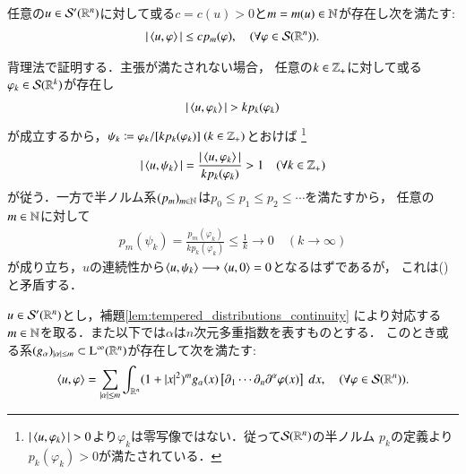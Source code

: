 	\begin{screen}
		\begin{lem}\label{lem:tempered_distributions_continuity}
			任意の$u \in \mathcal{S}'(\mathbb{R}^n)$に対して或る$c = c(u) > 0$と$m = m(u) \in \mathbb{N}$が存在し次を満たす:
			\begin{align}
				|\inprod<u,\varphi>| \leq c p_m(\varphi),
				\quad (\forall \varphi \in \rapid{\R^n}).
			\end{align}
		\end{lem}
	\end{screen}
	
	\begin{prf}
		背理法で証明する．主張が満たされない場合，
		任意の$k \in \mathbb{Z}_+$に対して或る$\varphi_k \in \mathcal{S}(\mathbb{R}^k)$が存在し
		\begin{align}
			|\inprod<u,\varphi_k>| > k p_k(\varphi_k)
		\end{align}
		が成立するから，$\psi_k \coloneqq \varphi_k / [k p_k(\varphi_k)]\ (k \in \mathbb{Z}_+)$とおけば
		\footnote{
			$|\inprod<u,\varphi_k>| > 0$より$\varphi_k$は零写像ではない．従って$\mathcal{S}(\mathbb{R}^n)$の半ノルム
			$p_k$の定義より$p_k(\varphi_k) > 0$が満たされている．
		}
		\begin{align}
			|\inprod<u,\psi_k>| = \frac{|\inprod<u,\varphi_k>|}{k p_k(\varphi_k)} > 1
			\quad (\forall k \in \Z_+)
			\label{eq:lem_tempered_distributions_continuity}
		\end{align}
		が従う．一方で半ノルム系$(p_m)_{m \in \mathbb{N}}$は$p_0 \leq p_1 \leq p_2 \leq \cdots$を満たすから，
		任意の$m \in \mathbb{N}$に対して
		\begin{align}
			p_m(\psi_k) = \frac{p_m(\varphi_k)}{k p_k(\varphi_k)} \leq \frac{1}{k}
			\longrightarrow 0 \quad (k \longrightarrow \infty)
		\end{align}
		が成り立ち，$u$の連続性から$\inprod<u,\psi_k> \longrightarrow \inprod<u,0> = 0$となるはずであるが，
		これは()と矛盾する．
		\QED
	\end{prf}
	
	\begin{screen}
		\begin{thm}[緩増加超関数の構造定理]\label{thm:structure_theorem_of_tempered_distributions}
			$u \in \mathcal{S}'(\mathbb{R}^n)$とし，補題\ref{lem:tempered_distributions_continuity}
			により対応する$m \in \mathbb{N}$を取る．また以下では$\alpha$は$n$次元多重指数を表すものとする．
			このとき或る系$(g_\alpha)_{|\alpha| \leq m} \subset \mathrm{L}^\infty(\mathbb{R}^n)$が存在して次を満たす:
			\begin{align}
				\inprod<u,\varphi> =
				\sum_{|\alpha| \leq m} \int_{\R^n} (1+|x|^2)^m g_\alpha(x) \left[ \partial_1 \cdots \partial_n \partial^\alpha \varphi(x) \right]\ dx,
				\quad (\forall \varphi \in \rapid{\R^n}).
			\end{align}
		\end{thm}
	\end{screen}
	
